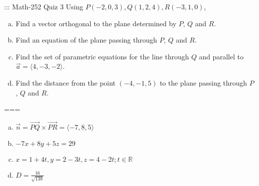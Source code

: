 ::: Math-252 Quiz 3
Using \(P(-2,0,3),Q(1,2,4),R(-3,1,0)\),
\begin{enumerate}[a.]
  \item Find a vector orthogonal to the plane determined by \(P\), \(Q\) and \(R\).
  \item Find an equation of the plane passing through \(P\), \(Q\) and \(R\).
  \item Find the set of parametric equations for the line through $Q$ and parallel to $\vec a=\langle 4,-3,-2\rangle$.
  \item Find the distance from the point $(-4,-1,5)$ to the plane passing through \(P\), \(Q\) and \(R\).
\end{enumerate}
===
\begin{enumerate}[a.]
  \item \(\vec n=\vec{PQ}\times\vec{PR}=\langle -7,8,5\rangle\)
  \item \(-7x+8y+5z=29\)
  \item \(x=1+4t,y=2-3t,z=4-2t;t\in\mathbb{R}\)
  \item \(D=\frac{16}{\sqrt{138}}\)
\end{enumerate}
